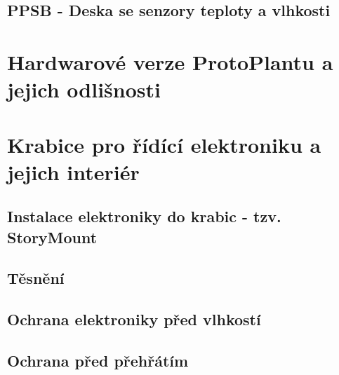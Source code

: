 \subsection{PPSB - Deska se senzory teploty a vlhkosti}

\section{Hardwarové verze ProtoPlantu a jejich odlišnosti}

\section{Krabice pro řídící elektroniku a jejich interiér}

\subsection{Instalace elektroniky do krabic - tzv. StoryMount}

\subsection{Těsnění}

\subsection{Ochrana elektroniky před vlhkostí}

\subsection{Ochrana před přehřátím}

\newpage